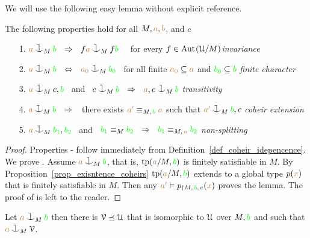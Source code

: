 We will use the following easy lemma without explicit reference.

\begin{lemma}\label{lem_coheir_independence}
  The following properties hold for all $M,{\color{brown} a},{\color{brown} b}$, and $c$
  \begin{itemize}
  \item[1.] ${\mr a}\cnonfork_M{\gr b}\ \ \IMP\ \ f{\mr a}\cnonfork_Mf{\gr b}$ \ \ 
            for every $f\in{\rm Aut\kern.15ex}(\EuScript U/M)$\hfill \textit{invariance}
  \item[2.] ${\mr a}\cnonfork_M{\gr b}\ \ \IFF\ \ {\mr a_0}\cnonfork_M{\gr b_0}$
            \ for all finite ${\color{brown} a_0}\subseteq{\color{brown}a}$ and 
            ${\color{green} b_0}\subseteq{\color{green}b}$ \hfill\textit{finite character}
  \item[3.] ${\mr a}\cnonfork_Mc,{\gr b}$ \ and \ 
            $c\cnonfork_M{\gr b}\ \ \IMP\ \ {\mr a},c\cnonfork_M{\gr b}$
            \hfill\hfill\hfill\textit{transitivity}
  \item[4.] ${\mr a}\cnonfork_M{\gr b}\ \ \IMP\ \ $ 
            there exists ${\color{brown} a'}\equiv_{M,\,{\color{green} b}}{\color{brown} a}$ such that 
            ${\mr a'}\cnonfork_M{\gr b},c$
            \textit{coheir extension}
  \item[5.] ${\mr a}\cnonfork_M{\gr b_1},{\gr b_2}$ \ and \ 
  ${\color{green} b_1}\equiv_M{\color{green} b_2}\ \ \Rightarrow\ \ {\color{green} b_1}\equiv_{M,\,{\color{brown} a}}{\color{green} b_2}$
            \hspace{\stretch{20}}\textit{non-splitting}
  \end{itemize}
\end{lemma}
\begin{proof}
  Properties - follow immediately from Definition~\ref{def_coheir_idepencence}.
  We prove .
  Assume ${\mr a}\cnonfork_M{\gr b}$, that is, ${\rm tp}({\color{brown} a}/M,{\color{green} b})$ is finitely satisfiable in $M$.
  By Proposition~\ref{prop_exisntence_coheirs} ${\rm tp}({\color{brown} a}/M,{\color{green} b})$ extends to a global type $p({\color{brown} x})$ that is finitely satisfiable in $M$.
  Then any ${\color{brown} a'}\vDash p_{\restriction M,\,{\color{green} b},\,c}({\color{brown} x})$ proves the lemma.
  The proof of \ssf{5} is left to the reader.
\end{proof}

\begin{proposition}\label{prop_saturate_heir}
  Let ${\mr a}\cnonfork_M{\gr b}$ then there is $\EuScript V\preceq\EuScript U$ that is isomorphic to $\EuScript U$ over $M,{\color{green} b}$ and such that ${\mr a}\cnonfork_M\V$.
\end{proposition}

